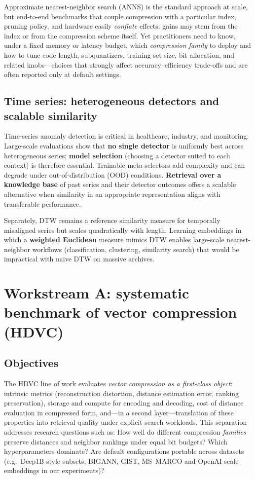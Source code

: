 \documentclass[11pt,a4paper]{article}
\begin{document}
Approximate nearest-neighbor search (ANNS) is the standard approach at scale, but end-to-end benchmarks that couple compression with a particular index, pruning policy, and hardware easily \emph{conflate} effects: gains may stem from the index or from the compression scheme itself. Yet practitioners need to know, under a fixed memory or latency budget, which \emph{compression family} to deploy and how to tune code length, subquantizers, training-set size, bit allocation, and related knobs---choices that strongly affect accuracy--efficiency trade-offs and are often reported only at default settings.

\subsection{Time series: heterogeneous detectors and scalable similarity}
Time-series anomaly detection is critical in healthcare, industry, and monitoring. Large-scale evaluations show that \textbf{no single detector} is uniformly best across heterogeneous series; \textbf{model selection} (choosing a detector suited to each context) is therefore essential. Trainable meta-selectors add complexity and can degrade under out-of-distribution (OOD) conditions. \textbf{Retrieval over a knowledge base} of past series and their detector outcomes offers a scalable alternative when similarity in an appropriate representation aligns with transferable performance.

Separately, DTW remains a reference similarity measure for temporally misaligned series but scales quadratically with length. Learning embeddings in which a \textbf{weighted Euclidean} measure mimics DTW enables large-scale nearest-neighbor workflows (classification, clustering, similarity search) that would be impractical with naive DTW on massive archives.

\section{Workstream A: systematic benchmark of vector compression (HDVC)}

\subsection{Objectives}
The HDVC line of work evaluates \emph{vector compression as a first-class object}: intrinsic metrics (reconstruction distortion, distance estimation error, ranking preservation), storage and compute for encoding and decoding, cost of distance evaluation in compressed form, and---in a second layer---translation of these properties into retrieval quality under explicit search workloads. This separation addresses research questions such as: How well do different compression \emph{families} preserve distances and neighbor rankings under equal bit budgets? Which hyperparameters dominate? Are default configurations portable across datasets (e.g.\ Deep1B-style subsets, BIGANN, GIST, MS~MARCO and OpenAI-scale embeddings in our experiments)?
\end{document}
